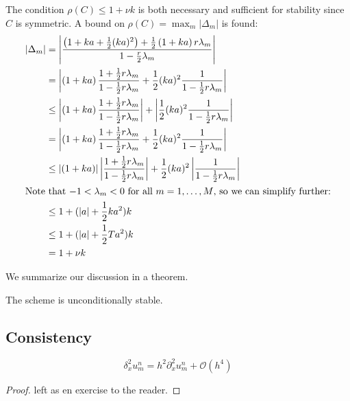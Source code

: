 The condition \( \rho(C) \le 1 + \nu k \) is
both necessary and sufficient for stability since \( C \) is symmetric.
A bound on \( \rho(C) = \max_{m} \lvert \Delta_m \rvert \) is found:
\begin{align}
  \left\lvert \Delta_m \right\rvert &= 
\left\lvert \frac{\left(1+ka+\frac{1}{2}(ka)^2\right) + \frac{1}{2}\left(1+ka\right)r \lambda_m}
{1 - \frac{r}{2} \lambda_m} \right\rvert \\
 &= 
 \left\lvert \left(1+ka\right)\frac{1+\frac{1}{2}r \lambda_m}{1 - \frac{1}{2}r \lambda_m} + \frac{1}{2}(ka)^2 \frac{1}{1 - \frac{1}{2}r \lambda_m} \right\rvert \\
 &\le \left\lvert \left(1+ka\right)\frac{1+\frac{1}{2}r \lambda_m}{1 - \frac{1}{2}r \lambda_m} \right\rvert + \left\lvert\frac{1}{2}(ka)^2 \frac{1}{1 - \frac{1}{2}r \lambda_m} \right\rvert \\
 &= 
 \left\lvert \left(1+ka\right)\frac{1+\frac{1}{2}r \lambda_m}{1 - \frac{1}{2}r \lambda_m} + \frac{1}{2}(ka)^2 \frac{1}{1 - \frac{1}{2}r \lambda_m} \right\rvert \\
 &\le \left\lvert \left(1+ka\right) \right\rvert \left\lvert \frac{1+\frac{1}{2}r \lambda_m}{1 - \frac{1}{2}r \lambda_m} \right\rvert + \frac{1}{2}(ka)^2 \left\lvert\frac{1}{1 - \frac{1}{2}r \lambda_m} \right\rvert \\
 \intertext{Note that \( -1 < \lambda_m < 0  \) for all \( m = 1, \dots, M \), so we can simplify further:}
 &\le 1 + (\lvert a \rvert + \frac{1}{2}k a^2 )k \\
 &\le 1 + (\lvert a \rvert + \frac{1}{2}T a^2)k \\
 &= 1 + \nu k
\end{align}

We summarize our discussion in a theorem.

\begin{theorem}
    The scheme is unconditionally stable.
\end{theorem}

\subsection{Consistency}

\begin{lemma}
    \label{central_difference}
    $$\delta_x^2u_{m}^{n} = h^2\partial_x^2 u_{m}^{n} + \mathcal{O}(h^4)$$
\end{lemma}
\begin{proof}
    left as en exercise to the reader.
\end{proof}

